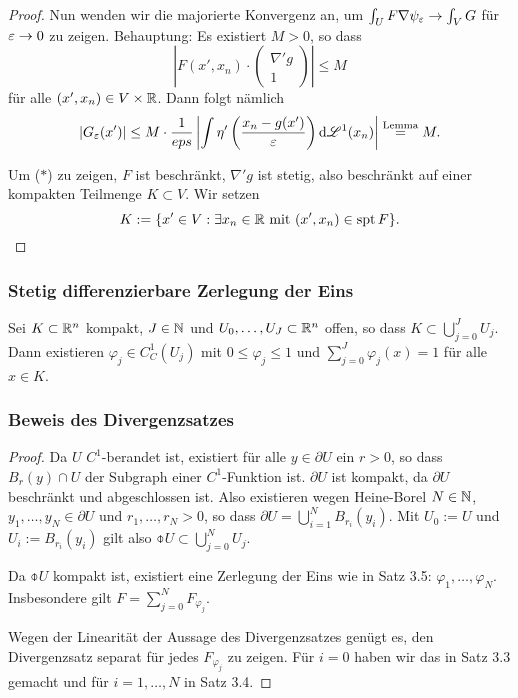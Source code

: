 \begin{proof}
 Nun wenden wir die majorierte Konvergenz an, um $\int_U F \nabla \psi_\varepsilon \to \int_V G$ für $\varepsilon \to 0$ zu zeigen. Behauptung: Es existiert $M > 0$, so dass
 \[ \left| F(x', x_n) \cdot \begin{pmatrix} \nabla' g \\ 1 \end{pmatrix} \right| \le M \tag{$*$} \]
 für alle $(x',x_n) \in V \times \mathbb{R}$. Dann folgt nämlich
 \[ |G_\varepsilon (x') | \le M \cdot \frac{1}{eps} \left| \int \eta' \left( \frac{x_n - g(x')}{\varepsilon} \right) \mathrm{d} \mathscr{L}^1(x_n) \right| \overset{\text{Lemma}}{=} M. \]

 Um ($*$) zu zeigen, $F$ ist beschränkt, $\nabla' g$ ist stetig, also beschränkt auf einer kompakten Teilmenge $K \subset V$. Wir setzen
 \[ K := \{ x' \in V : \exists x_n \in \mathbb{R} \text{ mit } (x', x_n) \in \mathrm{spt}\, F \}. \qedhere \]
\end{proof}

\subsubsection{Stetig differenzierbare Zerlegung der Eins}
\begin{thm}
 Sei $K \subset \mathbb{R}^n$ kompakt, $J \in \mathbb{N}$ und $U_0, \ldots, U_J \subset \mathbb{R}^n$ offen, so dass $K \subset \bigcup_{j=0}^J U_j$. Dann existieren $\varphi_j \in C_C^1(U_j)$ mit $0 \le \varphi_j \le 1$ und $\sum_{j=0}^J \varphi_j(x) = 1$ für alle $x \in K$.
\end{thm}

\subsubsection{Beweis des Divergenzsatzes}
\begin{proof}
Da $U$ $C^1$-berandet ist, existiert für alle $y \in \partial U$ ein $r > 0$, so dass $B_r(y) \cap U$ der Subgraph einer $C^1$-Funktion ist. $\partial U$ ist kompakt, da $\partial U$ beschränkt und abgeschlossen ist. Also existieren wegen Heine-Borel $N \in \mathbb{N}$, $y_1, \ldots, y_N \in \partial U$ und $r_1, \ldots, r_N > 0$, so dass $\partial U = \bigcup_{i=1}^N B_{r_i}(y_i)$. Mit $U_0 := U$ und $U_i := B_{r_i}(y_i)$ gilt also $\obar{U} \subset \bigcup_{j=0}^N U_j$.

Da $\obar{U}$ kompakt ist, existiert eine Zerlegung der Eins wie in Satz 3.5: $\varphi_1, \ldots, \varphi_N$. Insbesondere gilt $F = \sum_{j=0}^N F_{\varphi_j}$.

Wegen der Linearität der Aussage des Divergenzsatzes genügt es, den Divergenzsatz separat für jedes $F_{\varphi_j}$ zu zeigen. Für $i=0$ haben wir das in Satz 3.3 gemacht und für $i = 1, \ldots, N$ in Satz 3.4. 
\end{proof}

